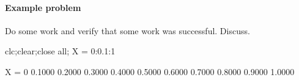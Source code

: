 \documentclass[12pt,letterpaper]{article}
\theoremstyle{definition}
\begin{document}




\paragraph{Example problem} Do some work and verify that some work was successful. Discuss.

\begin{matlabcode}
clc;clear;close all;
X = 0:0.1:1
\end{matlabcode}
\begin{matlaboutput}
X =
         0
    0.1000
    0.2000
    0.3000
    0.4000
    0.5000
    0.6000
    0.7000
    0.8000
    0.9000
    1.0000
\end{matlaboutput}
\end{document}
